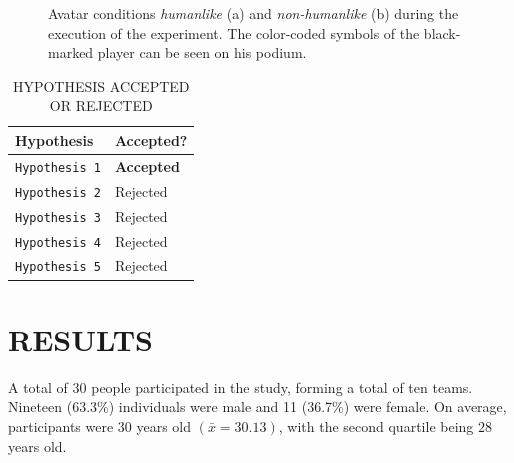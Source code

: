 \documentclass[sigchi]{acmart}
\begin{document}
	
\begin{figure}[H]
  \centering
  \qquad
  \caption[The avatars in the experimental environment]{Avatar conditions \textit{humanlike} (a) and \textit{non-humanlike} (b) during the execution of the experiment. The color-coded symbols of the black-marked player can be seen on his podium.}
  \label{AvatareImEinsatz}
\end{figure}

\begin{table}
  \caption{HYPOTHESIS ACCEPTED OR REJECTED}
  \label{AcceptOrReject}
  \begin{tabular}{ll}
    \toprule
    Hypothesis & Accepted? \\
    \midrule
     \texttt{Hypothesis 1} & \textbf{Accepted} \\
     \texttt{Hypothesis 2} & Rejected \\
     \texttt{Hypothesis 3} & Rejected \\
     \texttt{Hypothesis 4} & Rejected \\
     \texttt{Hypothesis 5} & Rejected \\
    \bottomrule
  \end{tabular}
\end{table}

\section{RESULTS}
A total of 30 people participated in the study, forming a total of ten teams. Nineteen (63.3\%) individuals were male and 11 (36.7\%) were female. On average, participants were 30 years old $(\bar{x} = 30.13)$, with the second quartile being $28$ years old. %
\end{document}
